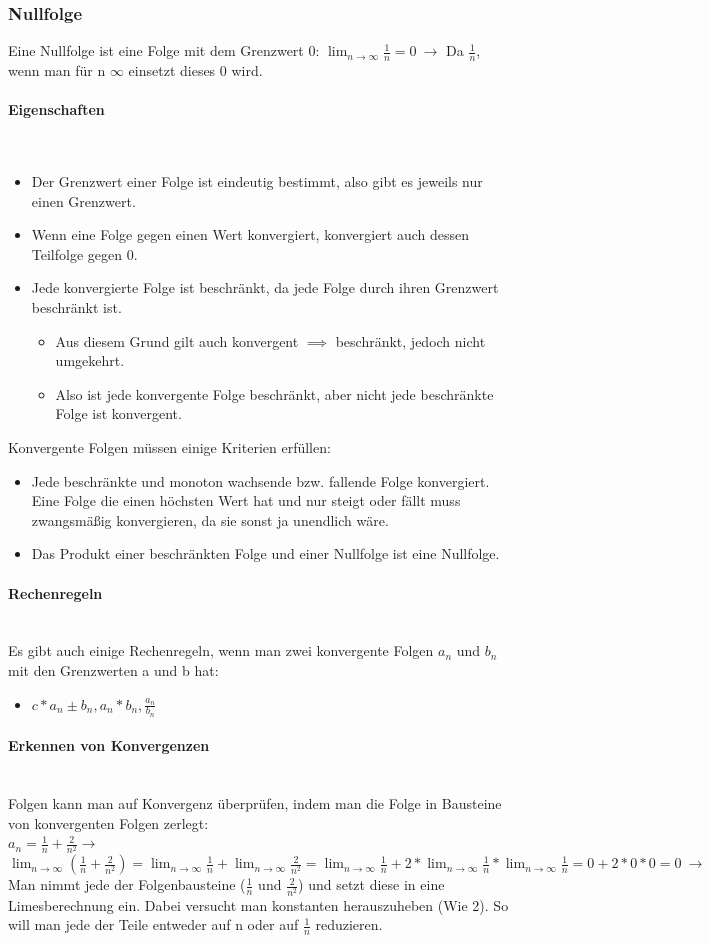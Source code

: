 \documentclass{article}
\newcommand{\paragraphlb}[1]{\paragraph{#1}\mbox{}\\}
\begin{document}
	\subsubsection{Nullfolge}
	Eine Nullfolge ist eine Folge mit dem Grenzwert 0: $\lim_{n\to\infty}\frac{1}{n}=0\ \to$ Da $\frac{1}{n}$, wenn man für n $\infty$ einsetzt dieses 0 wird.
	\paragraphlb{Eigenschaften}
	\begin{itemize}
		\item{Der Grenzwert einer Folge ist eindeutig bestimmt, also gibt es jeweils nur einen Grenzwert.}
		\item{Wenn eine Folge gegen einen Wert konvergiert, konvergiert auch dessen Teilfolge gegen 0.}
		\item{Jede konvergierte Folge ist beschränkt, da jede Folge durch ihren Grenzwert beschränkt ist.}
		\begin{itemize}
			\item{Aus diesem Grund gilt auch konvergent $\implies$ beschränkt, jedoch nicht umgekehrt.}
			\item{Also ist jede konvergente Folge beschränkt, aber nicht jede beschränkte Folge ist konvergent.}
		\end{itemize}
	\end{itemize}
	Konvergente Folgen müssen einige Kriterien erfüllen:
	\begin{itemize}
		\item{Jede beschränkte und monoton wachsende bzw. fallende Folge konvergiert. Eine Folge die einen höchsten Wert hat und nur steigt oder fällt muss zwangsmäßig konvergieren, da sie sonst ja unendlich wäre.}
		\item{Das Produkt einer beschränkten Folge und einer Nullfolge ist eine Nullfolge.}
	\end{itemize}
	\paragraphlb{Rechenregeln}
	Es gibt auch einige Rechenregeln, wenn man zwei konvergente Folgen $a_n$ und $b_n$ mit den Grenzwerten a und b hat:
	\begin{itemize}
		\item{$c*a_n \pm b_n, a_n*b_n, \frac{a_n}{b_n}$}
	\end{itemize}
	\paragraphlb{Erkennen von Konvergenzen}
	Folgen kann man auf Konvergenz überprüfen, indem man die Folge in Bausteine von konvergenten Folgen zerlegt: \\
	$a_n=\frac{1}{n}+\frac{2}{n^2} \to$ \\
	$\lim_{n\to\infty}(\frac{1}{n}+\frac{2}{n^2})=\lim_{n\to\infty}\frac{1}{n}+\lim_{n\to\infty}\frac{2}{n^2}=\lim_{n\to\infty}\frac{1}{n}+2*\lim_{n\to\infty}\frac{1}{n}*\lim_{n\to\infty}\frac{1}{n}=0+2*0*0=0\ \to$ Man nimmt jede der Folgenbausteine ($\frac{1}{n}$ und $\frac{2}{n^2}$) und setzt diese in eine Limesberechnung ein. Dabei versucht man konstanten herauszuheben (Wie 2). So will man jede der Teile entweder auf n oder auf $\frac{1}{n}$ reduzieren.
\end{document}
